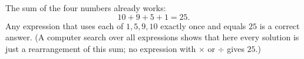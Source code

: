 The sum of the four numbers already works:
\[
\boxed{10+9+5+1=25}.
\]
Any expression that uses each of $1,5,9,10$ exactly once and equals $25$ is a correct answer. (A computer search over all expressions shows that here every solution is just a rearrangement of this sum; no expression with $\times$ or $\div$ gives $25$.)
